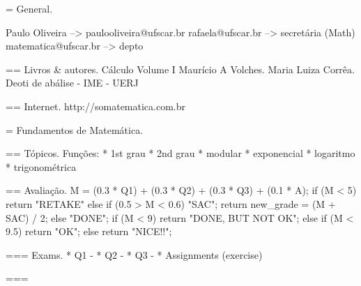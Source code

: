 = General.

Paulo Oliveira --> paulooliveira@ufscar.br
rafaela@ufscar.br --> secretária (Math)
matematica@ufscar.br --> depto



== Livros & autores.
Cálculo Volume I
Maurício A Volches.
Maria Luiza Corrêa.
Deoti de abálise - IME - UERJ

== Internet.
http://somatematica.com.br

= Fundamentos de Matemática.

== Tópicos.
Funções:
   * 1st grau
   * 2nd grau
   * modular
   * exponencial
   * logaritmo
   * trigonométrica

== Avaliação.
M = (0.3 * Q1) + (0.3 * Q2) + (0.3 * Q3) + (0.1 * A); 
if (M < 5) {
    return "RETAKE"
} else if (0.5 > M < 0.6) {
    "SAC";
    return new_grade = (M + SAC) / 2;
} else {
  "DONE";
   if (M < 9)
     return "DONE, BUT NOT OK";
   else if (M < 9.5)
     return "OK";
   else
     return "NICE!!";
}

=== Exams.
   * Q1 -
   * Q2 -
   * Q3 - 
   * Assignments (exercise)

=== 